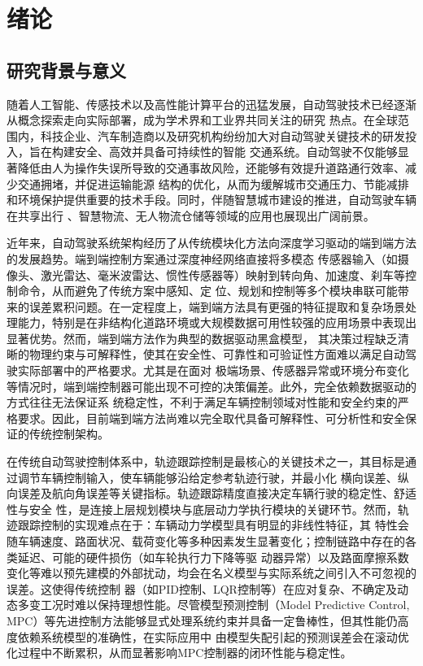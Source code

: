 \chapter{绪论}

\section{研究背景与意义}

随着人工智能、传感技术以及高性能计算平台的迅猛发展，自动驾驶技术已经逐渐从概念探索走向实际部署，成为学术界和工业界共同关注的研究
热点。在全球范围内，科技企业、汽车制造商以及研究机构纷纷加大对自动驾驶关键技术的研发投入，旨在构建安全、高效并具备可持续性的智能
交通系统。自动驾驶不仅能够显著降低由人为操作失误所导致的交通事故风险，还能够有效提升道路通行效率、减少交通拥堵，并促进运输能源
结构的优化，从而为缓解城市交通压力、节能减排和环境保护提供重要的技术手段。同时，伴随智慧城市建设的推进，自动驾驶车辆在共享出行
、智慧物流、无人物流仓储等领域的应用也展现出广阔前景。

近年来，自动驾驶系统架构经历了从传统模块化方法向深度学习驱动的端到端方法的发展趋势。端到端控制方案通过深度神经网络直接将多模态
传感器输入（如摄像头、激光雷达、毫米波雷达、惯性传感器等）映射到转向角、加速度、刹车等控制命令，从而避免了传统方案中感知、定
位、规划和控制等多个模块串联可能带来的误差累积问题\cite{end_to_end}。在一定程度上，端到端方法具有更强的特征提取和复杂场景处
理能力，特别是在非结构化道路环境或大规模数据可用性较强的应用场景中表现出显著优势。然而，端到端方法作为典型的数据驱动黑盒模型，
其决策过程缺乏清晰的物理约束与可解释性，使其在安全性、可靠性和可验证性方面难以满足自动驾驶实际部署中的严格要求。尤其是在面对
极端场景、传感器异常或环境分布变化等情况时，端到端控制器可能出现不可控的决策偏差。此外，完全依赖数据驱动的方式往往无法保证系
统稳定性，不利于满足车辆控制领域对性能和安全约束的严格要求。因此，目前端到端方法尚难以完全取代具备可解释性、可分析性和安全保
证的传统控制架构。

在传统自动驾驶控制体系中，轨迹跟踪控制是最核心的关键技术之一，其目标是通过调节车辆控制输入，使车辆能够沿给定参考轨迹行驶，并最小化
横向误差、纵向误差及航向角误差等关键指标\cite{model_and_control_survey}。轨迹跟踪精度直接决定车辆行驶的稳定性、舒适性与安全
性，是连接上层规划模块与底层动力学执行模块的关键环节。然而，轨迹跟踪控制的实现难点在于：车辆动力学模型具有明显的非线性特征，其
特性会随车辆速度、路面状况、载荷变化等多种因素发生显著变化；控制链路中存在的各类延迟、可能的硬件损伤（如车轮执行力下降等驱
动器异常）以及路面摩擦系数变化等难以预先建模的外部扰动，均会在名义模型与实际系统之间引入不可忽视的误差。这使得传统控制
器（如PID控制、LQR控制等）在应对复杂、不确定及动态多变工况时难以保持理想性能。尽管模型预测控制（Model Predictive Control, 
MPC）等先进控制方法能够显式处理系统约束并具备一定鲁棒性，但其性能仍高度依赖系统模型的准确性，在实际应用中
由模型失配引起的预测误差会在滚动优化过程中不断累积，从而显著影响MPC控制器的闭环性能与稳定性。

